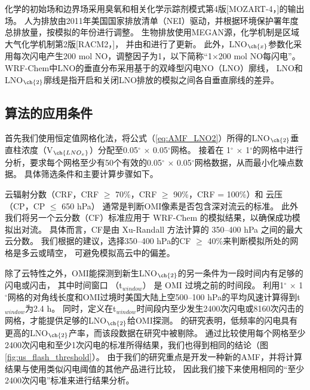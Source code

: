 化学的初始场和边界场采用臭氧和相关化学示踪剂模式第4版[MOZART-4，\citet{Emmons.2010}]的输出场。
人为排放由2011年美国国家排放清单（NEI）驱动，并根据环境保护署年度总排放量，按模拟的年份进行调整\citep{EPA.2015}。
生物排放使用MEGAN源，化学机制是区域大气化学机制第2版[RACM2，\citet{Goliff.2013}]，
并由\citet{Browne.2014}和\citet{Schwantes.2015}进行了更新。
此外，LNO$_{\ch{x}}$参数化采用每次闪电产生200 mol NO，调整因子为1，以下简称“1$\times$200 mol NO每闪电”。
WRF-Chem中LNO的垂直分布采用基于\citet{Ott.2010}的双峰型闪电NO（LNO）廓线\citep{Laughner.2017}，
LNO和LNO$_{\ch{2}}$廓线是指开启和关闭LNO排放的模拟之间各自垂直廓线的差异。


\subsection{算法的应用条件}

首先我们使用恒定值网格化法，将公式（\ref{eq:AMF_LNO2}）所得的LNO$_{\ch{2}}$垂直柱浓度（V$_{\ch{LNO_x}}$）分配至0.05$^{\circ}$ $\times$ 0.05$^{\circ}$网格\citep{Kuhlmann.2014}。
接着在 1$^{\circ}$ $\times$ 1$^{\circ}$的网格中进行分析，要求每个网格至少有50个有效的0.05$^{\circ}$ $\times$ 0.05$^{\circ}$网格数据，从而最小化噪点数据。
具体筛选条件和主要计算步骤如下。

云辐射分数（CRF，CRF $\geq$ 70\%，CRF $\geq$ 90\%，CRF = 100\%）和 云压（CP，CP $\leq$ 650 hPa）
通常是判断OMI像素是否包含深对流云的标准\citep{Ziemke.2009,Choi.2014,Pickering.2016}。
此外我们将另一个云分数（CF）标准应用于 WRF-Chem 的模拟结果，以确保成功模拟出对流。
具体而言，CF是由 Xu-Randall 方法计算的 350--400 hPa 之间的最大云分数\citep{Xu.1996,Strode.2017}。
我们根据\citet{Strode.2017}的建议，选择350--400 hPa的CF $\geq$ 40\%来判断模拟所处的网格是多云或晴空，
可避免模拟高云中的偏差。

除了云特性之外，OMI能探测到新生LNO$_{\ch{2}}$的另一条件为一段时间内有足够的闪电或闪击，
其中时间窗口 （t$_{window}$） 是 OMI 过境之前的时间段。
\citet{Lapierre.2020}利用1$^{\circ}$ $\times$ 1$^{\circ}$网格的对角线长度和OMI过境时美国大陆上空500--100 hPa的平均风速计算得到t$_{window}$为2.4 h。
同时，\citet{Lapierre.2020}定义在t$_{window}$时间段内至少发生2400次闪电或8160次闪击的网格，才能提供足够的LNO$_{\ch{2}}$给OMI探测。
\citet{Bucsela.2019}的研究表明，低频率的闪电具有更高的LNO$_{\ch{2}}$产率，而该段数据在\citet{Lapierre.2020}研究中被剔除。
通过比较使用每个网格至少2400次闪电和至少1次闪电的标准所得结果，我们也得到相同的结论（图\ref{fig:us_flash_threshold}）。
由于我们的研究重点是开发一种新的AMF，并将计算结果与使用类似闪电阈值的其他产品进行比较\citep{Pickering.2016,Lapierre.2020}，
因此我们接下来使用相同的“至少2400次闪电”标准来进行结果分析。


